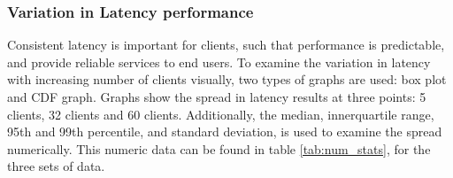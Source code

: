 \subsubsection{Variation in Latency performance}
Consistent latency is important for clients, such that performance is predictable, and provide reliable services to end users.
To examine the variation in latency with increasing number of clients visually, two types of graphs are used: box plot and CDF graph.
Graphs show the spread in latency results at three points: 5 clients, 32 clients and 60 clients.
Additionally, the median, innerquartile range, 95th and 99th percentile, and standard deviation, is used to examine the spread numerically.
This numeric data can be found in table \ref{tab:num_stats}, for the three sets of data.
\begin{table}




\end{table}
